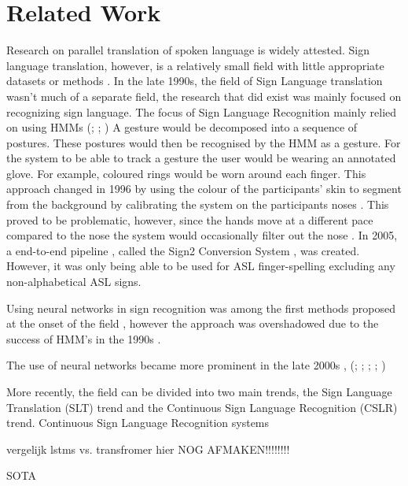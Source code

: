 \section{Related Work}

Research on parallel translation of spoken language is widely attested. Sign language translation, however, is a relatively small field with little appropriate datasets or methods \cite{camgoz2021content4all} \cite{bragg2019sign}. In the late 1990s, the field of Sign Language translation wasn't much of a separate field, the research that did exist was mainly focused on recognizing sign language. The focus of Sign Language Recognition mainly relied on using HMMs (\citealp{hiddenmarkov1l}; \citealp{hiddenmarkov2}; \citealp{hiddenmarkov3}) \cite{holden2005australian} A gesture would be decomposed into a sequence of postures. These postures would then be recognised by the HMM as a gesture. For the system to be able to track a gesture the user would be wearing an annotated glove. For example, coloured rings would be worn around each finger. This approach changed in 1996 by using the colour of the participants' skin to segment from the background by calibrating the system on the participants noses \cite{starner1998real}. This proved to be problematic, however, since the hands move at a different pace compared to the nose the system would occasionally filter out the nose \cite{starner1998real}. In 2005, a end-to-end pipeline , called the Sign2 Conversion System \cite{glenn2005image}, was created. However, it was only being able to be used for ASL finger-spelling excluding any non-alphabetical ASL signs.

Using neural networks in sign recognition was among the first methods proposed at the onset of the field \cite{murakami1991gesture} \cite{fels1993glove}, however the approach was overshadowed due to the success of HMM's in the 1990s \cite{cooper2011sign}.  

The use of neural networks became more prominent in the late 2000s \cite{parton2006sign}, (\citealp{ethopia}; \citealp{malaysia}; \citealp{persia}; \citealp{brazil}; \citealp{arabia})

More recently, the field can be divided into two main trends, the  Sign Language Translation (SLT) trend and the Continuous Sign Language Recognition (CSLR) trend. Continuous Sign Language Recognition systems \cite{koller2015continuous}

vergelijk lstms vs. transfromer hier
NOG AFMAKEN!!!!!!!!

SOTA \cite{camgoz2018neural}

